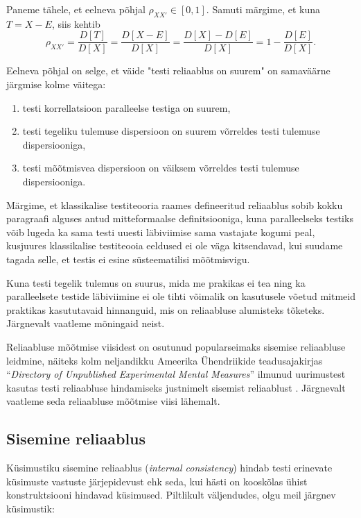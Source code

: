 \documentclass[a4paper]{article}
\numberwithin{equation}{section}
\theoremstyle{definition}
\begin{document}
Paneme tähele, et eelneva põhjal $\rho_{XX'} \in \left[0,1 \right]$. Samuti märgime, et kuna $T = X - E$, siis kehtib
\begin{equation*}
\rho_{XX'} = \frac{D \left[ T \right]}{D \left[ X \right] } = \frac{D \left[ X - E \right]}{D \left[ X \right] } = \frac{D \left[X \right] - D \left[ E \right]}{D \left[ X \right]} = 1 - \frac{D \left[ E \right]}{D \left[ X \right]} \text{.}
\end{equation*}

Eelneva põhjal on selge, et väide  "testi reliaablus on suurem" on samaväärne järgmise kolme väitega\cite[110]{Sijtsma2009}:
\begin{enumerate}
\item testi korrellatsioon paralleelse testiga on suurem,
\item testi tegeliku tulemuse dispersioon on suurem võrreldes testi tulemuse dispersiooniga,
\item testi mõõtmisvea dispersioon on väiksem võrreldes testi tulemuse dispersiooniga.
\end{enumerate}

Märgime, et klassikalise testiteooria raames defineeritud reliaablus sobib kokku paragraafi alguses antud mitteformaalse definitsiooniga, kuna paralleelseks testiks võib lugeda ka sama testi uuesti läbiviimise sama vastajate kogumi peal, kusjuures klassikalise testiteooia eeldused ei ole väga kitsendavad, kui suudame tagada selle, et testis ei esine s\"usteematilisi mõõtmisvigu. 

Kuna testi tegelik tulemus on suurus, mida me prakikas ei tea ning ka paralleelsete testide läbiviimine ei ole tihti võimalik on kasutusele võetud mitmeid praktikas kasututavaid hinnanguid, mis on reliaabluse alumisteks tõketeks. Järgnevalt vaatleme mõningaid neist.
 
Reliaabluse mõõtmise viisidest on osutunud popularseimaks sisemise reliaabluse leidmine, näiteks kolm neljandikku Ameerika \"Uhendriikide teadusajakirjas "`\textit{Directory of Unpublished Experimental Mental Measures}"' ilmunud uurimustest kasutas testi reliaabluse hindamiseks justnimelt sisemist reliaablust \cite[177] {Henson2001}. Järgnevalt vaatleme  seda reliaabluse mõõtmise viisi lähemalt. 


\subsection{Sisemine reliaablus}

K\"usimustiku sisemine reliaablus (\textit{internal consistency}) hindab testi erinevate k\"usimuste vastuste järjepidevust ehk seda, kui hästi on kooskõlas \"uhist  konstruktsiooni hindavad k\"usimused\cite[177] {Henson2001}. Piltlikult väljendudes, olgu meil järgnev k\"usimustik: 
\end{document}
